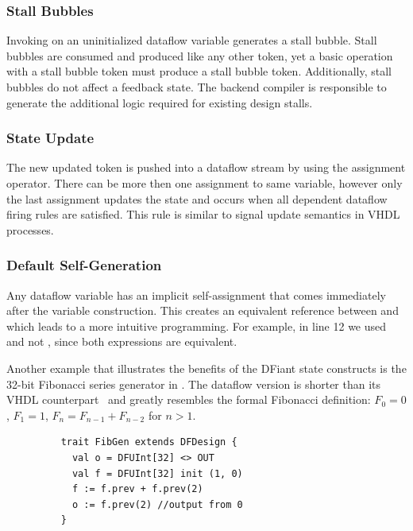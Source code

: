 \subsubsection{Stall Bubbles} 
\label{sec:stall_bubbles}
Invoking  on an uninitialized dataflow variable generates a stall bubble. Stall bubbles are consumed and produced like any other token, yet a basic operation with a stall bubble token must produce a stall bubble token. Additionally, stall bubbles do not affect a feedback state. The backend compiler is responsible to generate the additional logic required for existing design stalls. 

\subsubsection{State Update} 
\label{sec:state_update}
The new updated token is pushed into a dataflow stream by using the \code{:=} assignment operator. There can be more then one assignment to same variable, however only the last assignment updates the state and occurs when all dependent dataflow firing rules are satisfied. This rule is similar to signal update semantics in VHDL processes.

\subsubsection{Default Self-Generation} 
\label{sec:default_self_gen}
Any dataflow variable  has an implicit self-assignment  that comes immediately after the variable construction. This creates an equivalent reference between  and  which leads to a more intuitive programming.
For example, in line 12 we used  and not , since both expressions are equivalent.

\vspace{2ex}

Another example that illustrates the benefits of the DFiant state constructs is the 32-bit Fibonacci series generator in . The dataflow version is shorter than its VHDL counterpart~\cite{fibgenvhdl} and greatly resembles the formal Fibonacci definition: $F_0 = 0$, $F_1 = 1$, $F_n = F_{n-1} + F_{n-2}$ for $n > 1$. 

\begin{figure}[h]
  \centering
  \captionsetup{justification=centering}    

  \begin{verbatim}
    trait FibGen extends DFDesign {
      val o = DFUInt[32] <> OUT
      val f = DFUInt[32] init (1, 0)
      f := f.prev + f.prev(2)
      o := f.prev(2) //output from 0
    }
  \end{verbatim}
  \label{fig:FibGen}
\end{figure}

